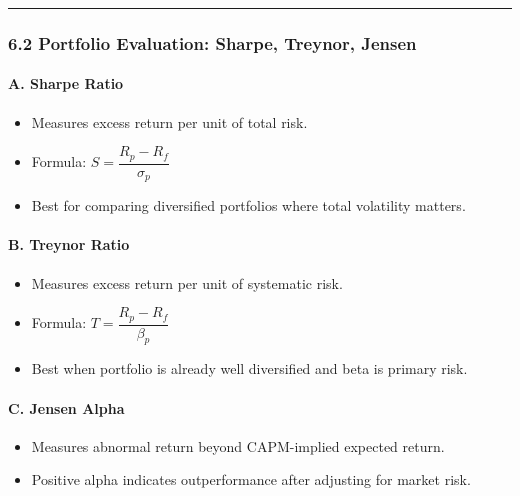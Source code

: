 \documentclass[
]{article}
\providecommand{\tightlist}{%
  \setlength{\itemsep}{0pt}\setlength{\parskip}{0pt}}
\begin{document}
\begin{center}\rule{0.5\linewidth}{0.5pt}\end{center}

\hypertarget{portfolio-evaluation-sharpe-treynor-jensen}{%
\subsubsection{6.2 Portfolio Evaluation: Sharpe, Treynor,
Jensen}\label{portfolio-evaluation-sharpe-treynor-jensen}}

\hypertarget{a.-sharpe-ratio}{%
\paragraph{A. Sharpe Ratio}\label{a.-sharpe-ratio}}

\begin{itemize}
\tightlist
\item
  Measures excess return per unit of total risk.
\item
  Formula: $S = \dfrac{R_p - R_f}{\sigma_p}$
\item
  Best for comparing diversified portfolios where total volatility
  matters.
\end{itemize}

\hypertarget{b.-treynor-ratio}{%
\paragraph{B. Treynor Ratio}\label{b.-treynor-ratio}}

\begin{itemize}
\tightlist
\item
  Measures excess return per unit of systematic risk.
\item
  Formula: $T = \dfrac{R_p - R_f}{\beta_p}$
\item
  Best when portfolio is already well diversified and beta is primary
  risk.
\end{itemize}

\hypertarget{c.-jensen-alpha}{%
\paragraph{C. Jensen Alpha}\label{c.-jensen-alpha}}

\begin{itemize}
\tightlist
\item
  Measures abnormal return beyond CAPM-implied expected return.
\item
  Positive alpha indicates outperformance after adjusting for market
  risk.
\end{itemize}
\end{document}
